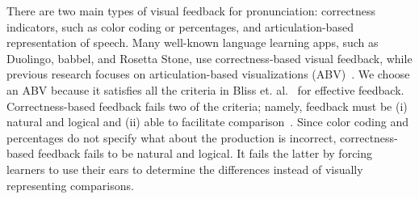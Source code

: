 There are two main types of visual feedback for pronunciation: correctness indicators, such as color coding or percentages, and articulation-based representation of speech. Many well-known language learning apps, such as Duolingo, babbel, and Rosetta Stone, use correctness-based visual feedback, while previous research focuses on articulation-based visualizations (ABV)~\cite{carey_call_2004,hew_effect_2004,offerman_visual_2016}. We choose an ABV because it satisfies all the criteria in Bliss et. al.~\cite{bliss2018computer} for effective feedback. Correctness-based feedback fails two of the criteria; namely, feedback must be (i) natural and logical and (ii) able to facilitate comparison~\cite{bliss2018computer}. Since color coding and percentages do not specify what about the production is incorrect, correctness-based feedback fails to be natural and logical. It fails the latter by forcing learners to use their ears to determine the differences instead of visually representing comparisons. 

